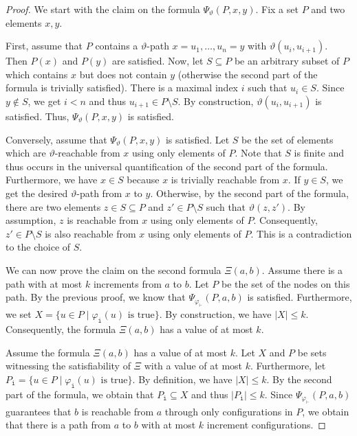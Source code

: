 \documentclass{LMCS}
\newcommand{\configstep}[1][]{\vdash_{#1}}
\newcommand{\iOp}{\ensuremath{\mathtt{i}}}
\begin{document}
\begin{proof}
 We start with the claim on the formula $\Psi_{\vartheta}(P,x,y)$.  Fix
a set $P$ and two elements $x,y$.

First, assume that $P$ contains a $\vartheta$-path $x = u_1,\ldots,u_n = y$ with
$\vartheta(u_i,u_{i+1})$.  Then $P(x)$ and $P(y)$ are satisfied. Now, let $S
\subseteq P$ be an arbitrary subset of $P$ which contains $x$ but does not
contain $y$ (otherwise the second part of the formula is trivially satisfied).
There is a maximal index $i$ such that $u_i \in S$. Since $y \not\in S$, we get
$i < n$ and thus $u_{i+1} \in P \setminus S$. By construction,
$\vartheta(u_i,u_{i+1})$ is satisfied. Thus, $\Psi_{\vartheta}(P,x,y)$ is
satisfied.

Conversely, assume that $\Psi_{\vartheta}(P,x,y)$ is satisfied. Let $S$ be the
set of elements which are $\vartheta$-reachable from $x$ using only elements of
$P$. Note that $S$ is finite and thus occurs in the universal quantification of
the second part of the formula. Furthermore, we have $x \in S$ because $x$ is 
trivially reachable from $x$. If $y \in S$, we get the desired $\vartheta$-path from $x$ to $y$.
Otherwise, by the second part of the formula, there are two elements $z \in S
\subseteq P$ and $z' \in P \setminus S$ such that $\vartheta(z,z')$. By
assumption, $z$ is reachable from $x$ using only elements of $P$. Consequently,
$z' \in P \setminus S$ is also reachable from $x$ using only elements of $P$.
This is a contradiction to the choice of $S$.

We can now prove the claim on the second formula $\Xi(a,b)$. Assume there is a
path with at most $k$ increments from $a$ to $b$. Let $P$ be the set of the
nodes on this path. By the previous proof, we know that
$\Psi_{\varphi_{\configstep}}(P,a,b)$ is satisfied. Furthermore, we set $X = \{
u \in P \mid \varphi_{\iOp}(u) \text{ is true}\}$. By construction, we have $|X|
\le k$. Consequently, the formula $\Xi(a,b)$ has a value of at most $k$.

Assume the formula $\Xi(a,b)$ has a value of at most $k$. Let $X$ and $P$ be
sets witnessing the satisfiability of $\Xi$ with a value of at most $k$.
Furthermore, let $P_\iOp = \{ u \in P \mid \varphi_{\iOp}(u) \text{ is true}\}$.
By definition, we have $|X| \le k$. By the second part of the formula, we obtain
that $P_\iOp \subseteq X$ and thus $|P_\iOp| \le k$. Since
$\Psi_{\varphi_{\configstep}}(P,a,b)$ guarantees that $b$ is reachable from $a$
through only configurations in $P$, we obtain that there is a path from $a$ to
$b$ with at most $k$ increment configurations.
\end{proof}
\end{document}

